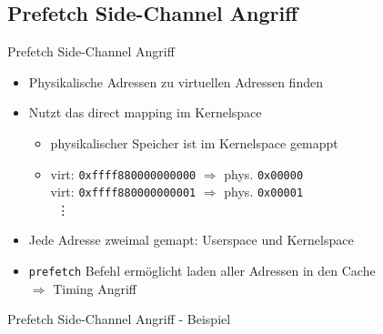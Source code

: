 \documentclass[german,10pt,xcolor=colortbl,compress
]{beamer}
\begin{document}
\subsection{Prefetch Side-Channel Angriff}
\begin{frame}{Prefetch Side-Channel Angriff}
\begin{itemize}
	\item Physikalische Adressen zu virtuellen Adressen finden
	\item Nutzt das direct mapping im Kernelspace
	\begin{itemize}
		\item physikalischer Speicher ist im Kernelspace gemappt
		\item virt: \texttt{0xffff880000000000} $ \Rightarrow $ phys. \texttt{0x00000}\\
		virt: \texttt{0xffff880000000001} $ \Rightarrow $ phys. \texttt{0x00001}\\
		~\vdots
	\end{itemize}
	\item Jede Adresse zweimal gemapt: Userspace und Kernelspace
	\item \texttt{prefetch} Befehl ermöglicht laden aller Adressen in den Cache \\
	$ \Rightarrow $ Timing Angriff
\end{itemize}
\end{frame}

\begin{frame}{Prefetch Side-Channel Angriff - Beispiel}
\only<1>{~\\}
\end{frame}
\end{document}

